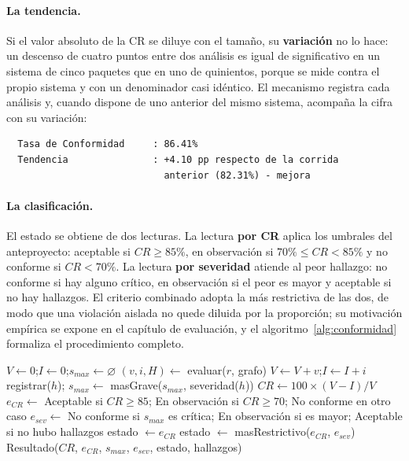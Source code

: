 \paragraph{La tendencia.} Si el valor absoluto de la CR se diluye con el tamaño, su \textbf{variación} no lo hace: un descenso de cuatro puntos entre dos análisis es igual de significativo en un sistema de cinco paquetes que en uno de quinientos, porque se mide contra el propio sistema y con un denominador casi idéntico. El mecanismo registra cada análisis y, cuando dispone de uno anterior del mismo sistema, acompaña la cifra con su variación:

\begin{verbatim}
  Tasa de Conformidad     : 86.41%
  Tendencia               : +4.10 pp respecto de la corrida
                            anterior (82.31%) - mejora
\end{verbatim}

\paragraph{La clasificación.} El estado se obtiene de dos lecturas. La lectura \textbf{por CR} aplica los umbrales del anteproyecto: aceptable si $CR \geq 85\%$, en observación si $70\% \leq CR < 85\%$ y no conforme si $CR < 70\%$. La lectura \textbf{por severidad} atiende al peor hallazgo: no conforme si hay alguno crítico, en observación si el peor es mayor y aceptable si no hay hallazgos. El criterio combinado adopta la más restrictiva de las dos, de modo que una violación aislada no quede diluida por la proporción; su motivación empírica se expone en el capítulo de evaluación, y el algoritmo~\ref{alg:conformidad} formaliza el procedimiento completo.

\begin{algorithm}[tbp]
\caption{Cálculo de la Tasa de Conformidad y clasificación del estado.}
\label{alg:conformidad}
\begin{algorithmic}[1]
\STATE $V \leftarrow 0$;\quad $I \leftarrow 0$;\quad $s_{max} \leftarrow \varnothing$
    \STATE $(v, i, H) \leftarrow$ evaluar($r$, grafo) 
    \STATE $V \leftarrow V + v$;\quad $I \leftarrow I + i$
        \STATE registrar($h$); \quad $s_{max} \leftarrow$ masGrave($s_{max}$, severidad($h$))
    \ENDFOR
\ENDFOR
\STATE $CR \leftarrow 100 \times (V - I) / V$ 
\STATE $e_{CR} \leftarrow$ Aceptable si $CR \geq 85$; En observación si $CR \geq 70$; No conforme en otro caso
\STATE $e_{sev} \leftarrow$ No conforme si $s_{max}$ es crítica; En observación si es mayor; Aceptable si no hubo hallazgos
    \STATE estado $\leftarrow e_{CR}$
\ELSE
    \STATE estado $\leftarrow$ masRestrictivo($e_{CR}$, $e_{sev}$)
\ENDIF
\RETURN Resultado($CR$, $e_{CR}$, $s_{max}$, $e_{sev}$, estado, hallazgos)
\end{algorithmic}
\end{algorithm}


